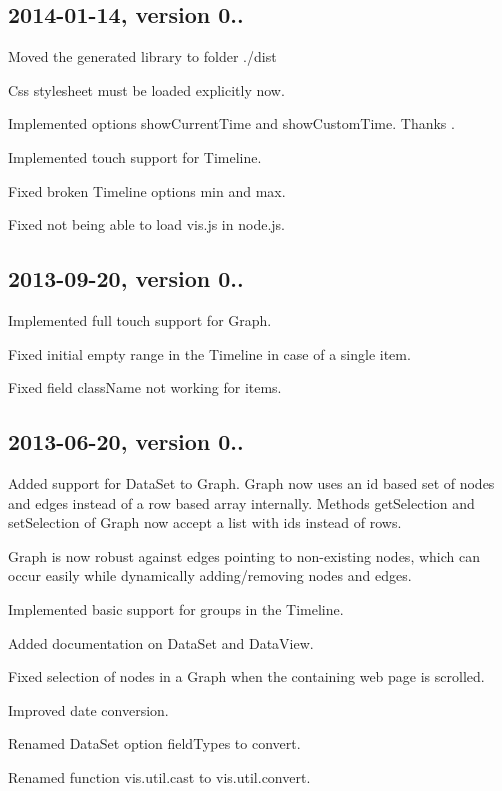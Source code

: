 \subsection*{2014-\/01-\/14, version 0..}


\begin{DoxyItemize}
\item Moved the generated library to folder {\ttfamily ./dist}
\item Css stylesheet must be loaded explicitly now.
\item Implemented options {\ttfamily show\+Current\+Time} and {\ttfamily show\+Custom\+Time}. Thanks .
\item Implemented touch support for Timeline.
\item Fixed broken Timeline options {\ttfamily min} and {\ttfamily max}.
\item Fixed not being able to load vis.\+js in node.\+js.
\end{DoxyItemize}

\subsection*{2013-\/09-\/20, version 0..}


\begin{DoxyItemize}
\item Implemented full touch support for Graph.
\item Fixed initial empty range in the Timeline in case of a single item.
\item Fixed field {\ttfamily class\+Name} not working for items.
\end{DoxyItemize}

\subsection*{2013-\/06-\/20, version 0..}


\begin{DoxyItemize}
\item Added support for Data\+Set to Graph. Graph now uses an id based set of nodes and edges instead of a row based array internally. Methods get\+Selection and set\+Selection of Graph now accept a list with ids instead of rows.
\item Graph is now robust against edges pointing to non-\/existing nodes, which can occur easily while dynamically adding/removing nodes and edges.
\item Implemented basic support for groups in the Timeline.
\item Added documentation on Data\+Set and Data\+View.
\item Fixed selection of nodes in a Graph when the containing web page is scrolled.
\item Improved date conversion.
\item Renamed Data\+Set option {\ttfamily field\+Types} to {\ttfamily convert}.
\item Renamed function {\ttfamily vis.\+util.\+cast} to {\ttfamily vis.\+util.\+convert}.
\end{DoxyItemize}

